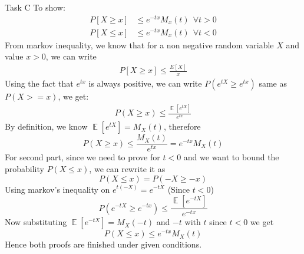 \begin{task}{Task C}
	To show:
	\begin{align}
		P[X\geq x] & \leq e^{-tx}M_{x}(t) \:\:\forall t>0 \\
		P[X\leq x] & \leq e^{-tx}M_{x}(t) \:\:\forall t<0
	\end{align}
	From markov inequality, we know that for a non negative random variable $X$ and value $x>0$, we can write
	\begin{align}
		P[X\geq x]\leq \frac{E[X]}{x}
	\end{align}
	Using the fact that $e^{tx}$ is always positive, we can write $P(e^{tX}\geq e^{tx})$ same as $P(X>=x)$, we get:
	\begin{align}
		P(X\geq x)\leq \frac{\mathop{\mathbb{E}}[e^{tX}]}{e^{tx}}
	\end{align}
	By definition, we know $\mathop{\mathbb{E}}[e^{tX}]=M_{X}(t)$, therefore
	\begin{equation}
		P(X\geq x)\leq \frac{M_{X}(t)}{e^{tx}}=e^{-tx}M_{X}(t)
	\end{equation}
	For second part, since we need to prove for $t<0$ and we want to bound the probability $P(X\leq x)$, we can rewrite it as
	\begin{equation}
		P(X \leq x) = P(-X\geq -x)
	\end{equation}
	Using markov's inequality on $e^{t(-X)}=e^{-tX}$ (Since $t<0$)
	\begin{equation}
		P(e^{-tX}\geq e^{-tx})\leq \frac{\mathop{\mathbb{E}}[e^{-tX}]}{e^{-tx}}
	\end{equation}
	Now substituting $\mathop{\mathbb{E}}[e^{-tX}]=M_{X}(-t)$ and $- t$ with $t$ since $t<0$ we get
	\begin{equation}
		P(X\leq x)\leq e^{-tx}M_{X}(t)
	\end{equation}
	Hence both proofs are finished under given conditions.
\end{task}
